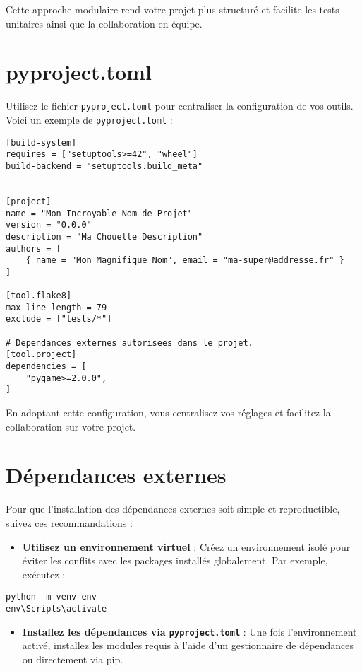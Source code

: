 \documentclass[a4paper,12pt]{article}
\begin{document}
Cette approche modulaire rend votre projet plus structuré et facilite les tests unitaires ainsi que la collaboration en équipe.
\section{pyproject.toml}

Utilisez le fichier \texttt{pyproject.toml} pour centraliser la configuration de vos outils. Voici un exemple de \texttt{pyproject.toml} :

\begin{lstlisting}
[build-system]
requires = ["setuptools>=42", "wheel"]
build-backend = "setuptools.build_meta"


[project]
name = "Mon Incroyable Nom de Projet"
version = "0.0.0"
description = "Ma Chouette Description"
authors = [
    { name = "Mon Magnifique Nom", email = "ma-super@addresse.fr" }
]

[tool.flake8]
max-line-length = 79
exclude = ["tests/*"]

# Dependances externes autorisees dans le projet.
[tool.project]
dependencies = [
    "pygame>=2.0.0",
]
\end{lstlisting}

En adoptant cette configuration, vous centralisez vos réglages et facilitez la collaboration sur votre projet.


\section{Dépendances externes}

Pour que l'installation des dépendances externes soit simple et reproductible, suivez ces recommandations :

\begin{itemize}
    \item \textbf{Utilisez un environnement virtuel} : Créez un environnement isolé pour éviter les conflits avec les packages installés globalement. Par exemple, exécutez :
\end{itemize}

\begin{lstlisting}
python -m venv env
env\Scripts\activate
\end{lstlisting}

\begin{itemize}
    \item \textbf{Installez les dépendances via \texttt{pyproject.toml}} : Une fois l'environnement activé, installez les modules requis à l'aide d'un gestionnaire de dépendances ou directement via pip.
\end{itemize}
\end{document}
